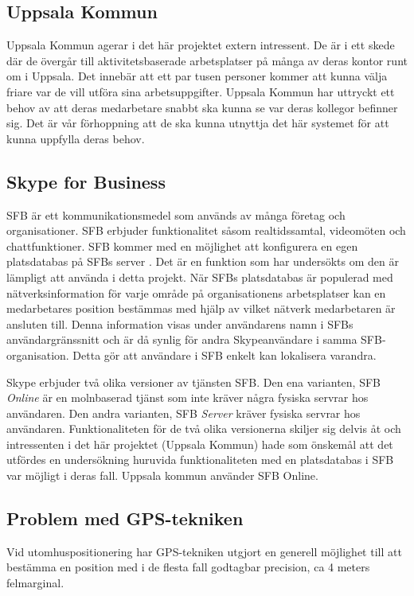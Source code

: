 \documentclass[a4paper,12pt]{article}
\begin{document}
 \subsection{Uppsala Kommun}
 Uppsala Kommun agerar i det här projektet extern intressent. De är i ett skede där de övergår till aktivitetsbaserade arbetsplatser på många av deras kontor runt om i Uppsala. Det innebär att ett par tusen personer kommer att kunna välja friare var de vill utföra sina arbetsuppgifter. Uppsala Kommun har uttryckt ett behov av att deras medarbetare snabbt ska kunna se var deras kollegor befinner sig. Det är vår förhoppning att de ska kunna utnyttja det här systemet för att kunna uppfylla deras behov.

 \subsection{Skype for Business}\label{SFB}
 SFB är ett kommunikationsmedel som används av många företag och organisationer. SFB erbjuder funktionalitet såsom realtidssamtal, videomöten och chattfunktioner. SFB kommer med en möjlighet att konfigurera en egen platsdatabas på SFBs server \cite{Microsoft-Office}. Det är en funktion som har undersökts om den är lämpligt att använda i detta projekt. När SFBs platsdatabas är populerad med nätverksinformation för varje område på organisationens arbetsplatser kan en medarbetares position bestämmas med hjälp av vilket nätverk medarbetaren är ansluten till. Denna information visas under användarens namn i SFBs användargränssnitt och är då synlig för andra Skypeanvändare i samma SFB-organisation. Detta gör att användare i SFB enkelt kan lokalisera varandra\cite{SFBpresence}.

 Skype erbjuder två olika versioner av tjänsten SFB. Den ena varianten, SFB \textit{Online} är en molnbaserad tjänst som inte kräver några fysiska servrar hos användaren\cite{SFBonline}.
 Den andra varianten, SFB \textit{Server} kräver fysiska servrar hos användaren\cite{SFBserver}. Funktionaliteten för de två olika versionerna skiljer sig delvis åt och intressenten i det här projektet (Uppsala Kommun) hade som önskemål att det utfördes en undersökning huruvida funktionaliteten med en platsdatabas i SFB var möjligt i deras fall. Uppsala kommun använder SFB Online.

 \subsection{Problem med GPS-tekniken}
 Vid utomhuspositionering har GPS-tekniken utgjort en generell möjlighet till att bestämma en position med i de flesta fall godtagbar precision, ca 4 meters felmarginal\cite{GPS_US_ACCURACY}.
\end{document}
